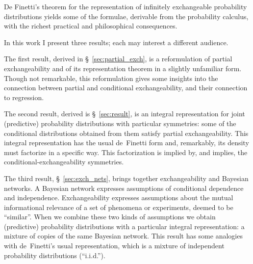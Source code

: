 \documentclass[\ifafour a4paper,12pt,\else a5paper,10pt,\fi%
onecolumn,oneside,article,%
british%
]{memoir}
\theoremstyle{remark}
\theoremstyle{innote}
\renewcommand*{\|}[1][]{\nonscript\,#1\vert\nonscript\,\mathopen{}}
\newcommand*{\sect}{\S}%
\renewcommand*{\=}{\TextOrMath\texteq\eq}
\begin{document}
De Finetti's theorem for the representation of infinitely exchangeable
probability distributions yields some of the formulae, derivable from the
probability calculus, with the richest practical and philosophical
consequences.%

In this work I present three results; each may interest a different
audience.

The first result, derived in \sect~\ref{sec:partial_exch}, is a
reformulation of partial exchangeability and of its representation theorem
in a slightly unfamiliar form. Though not remarkable, this reformulation
gives some insights into the connection between partial and conditional
exchangeability, and their connection to regression.

The second result, derived is \sect~\ref{sec:result}, is an integral
representation for joint (predictive) probability distributions with
particular symmetries: some of the conditional distributions obtained from
them satisfy partial exchangeability. This integral representation has the
usual de~Finetti form and, remarkably, its density must factorize in a
specific way. This factorization is implied by, and implies, the
conditional-exchangeability symmetries.

The third result, \sect~\ref{sec:exch_nets}, brings together
exchangeability and Bayesian networks. A Bayesian network expresses
assumptions of conditional dependence and independence. Exchangeability
expresses assumptions about the mutual informational relevance of a set of
phenomena or experiments, deemed to be \enquote{similar}. When we combine
these two kinds of assumptions we obtain (predictive) probability
distributions with a particular integral representation: a mixture of
copies of the same Bayesian network. This result has some analogies with
de~Finetti's usual representation, which is a mixture of independent
probability distributions (\enquote{i.i.d.}).


\end{document}
